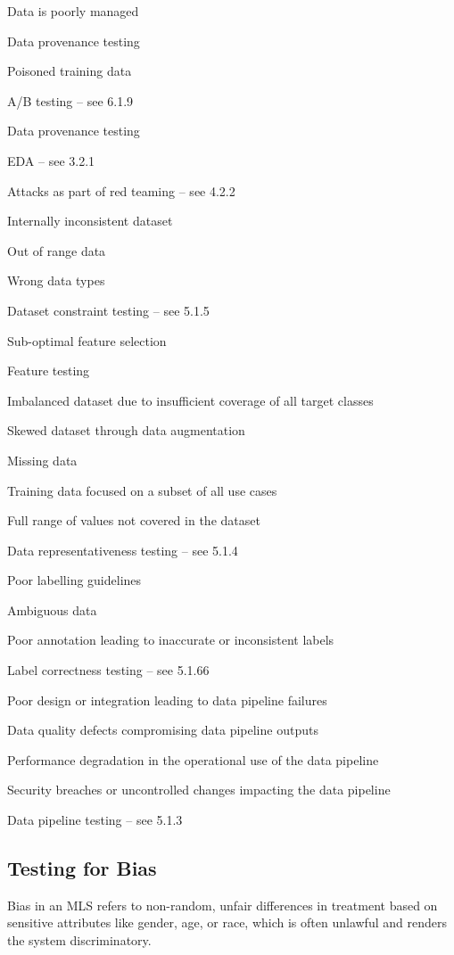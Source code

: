 \documentclass[
  letterpaper,
  DIV=11,
  numbers=noendperiod,
  oneside]{scrreprt}
\begin{document}
\begin{tcolorbox}
Data is poorly managed

Data provenance testing

Poisoned training data

A/B testing -- see 6.1.9

Data provenance testing

EDA -- see 3.2.1

Attacks as part of red teaming -- see 4.2.2

Internally inconsistent dataset

Out of range data

Wrong data types

Dataset constraint testing -- see 5.1.5

Sub-optimal feature selection

Feature testing

Imbalanced dataset due to insufficient coverage of all target classes

Skewed dataset through data augmentation

Missing data

Training data focused on a subset of all use cases

Full range of values not covered in the dataset

Data representativeness testing -- see 5.1.4

Poor labelling guidelines

Ambiguous data

Poor annotation leading to inaccurate or inconsistent labels

Label correctness testing -- see 5.1.66

Poor design or integration leading to data pipeline failures

Data quality defects compromising data pipeline outputs

Performance degradation in the operational use of the data pipeline

Security breaches or uncontrolled changes impacting the data pipeline

Data pipeline testing -- see 5.1.3

\subsection{Testing for Bias}\label{testing-for-bias}

Bias in an MLS refers to non-random, unfair differences in treatment
based on sensitive attributes like gender, age, or race, which is often
unlawful and renders the system discriminatory.


\end{tcolorbox}
\end{document}
